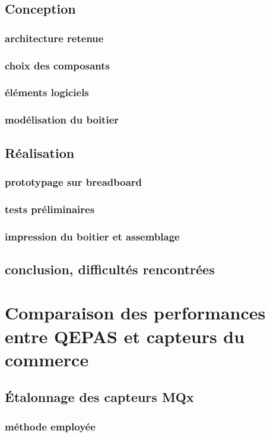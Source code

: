 \documentclass[a4paper]{report}
\begin{document}
	\section{Conception}
	\subsection{architecture retenue}
	\subsection{choix des composants}
	\subsection{éléments logiciels}
	\subsection{modélisation du boitier}
	
	\section{Réalisation}
	\subsection{prototypage sur breadboard}
	\subsection{tests préliminaires}
	\subsection{impression du boitier et assemblage}
	
	\section{conclusion, difficultés rencontrées}

	\chapter{Comparaison des performances entre QEPAS et capteurs du commerce}
	\section{Étalonnage des capteurs MQx}
	\subsection{méthode employée}
\end{document}

